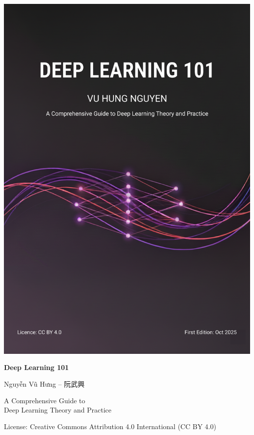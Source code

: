 \documentclass[10pt,\papersize,twoside,openright]{book}
\begin{document}
{{{{{{{{                \includegraphics[width=\paperwidth,height=\paperheight]{images/DeepLearning101-cover-A5.png}%
              }%
            }%
          }%
        }%
      }%
    }%
  }%
}
\mbox{}%
\endgroup %
\clearpage

\begin{titlepage}
\thispagestyle{empty}
\centering
\vspace*{\fill}

{\Huge\bfseries Deep Learning 101\par}
\vspace{2cm}

{\Large Nguyễn Vũ Hưng -- 阮武興 \par}
\vspace{2cm}

{\large A Comprehensive Guide to\\
Deep Learning Theory and Practice\par}

\vspace{3cm}

{\large \DTMtoday\par}
\vspace{1cm}

{\small License: Creative Commons Attribution 4.0 International (CC BY 4.0)\par}

\vspace*{\fill}
\end{titlepage}
\end{document}
